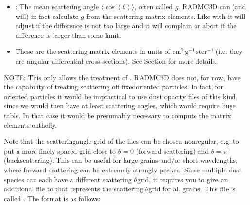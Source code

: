 \documentclass[letterpaper,10pt,english]{sphinxmanual}
\begin{document}
\begin{itemize}
\item {} 
: The mean scattering angle
\(\langle\cos(\theta)\rangle\), often called \(g\). RADMC\sphinxhyphen{}3D can (and will) in
fact calculate \(g\) from the scattering matrix elements. Like with
 it will adjust if the difference is not
too large and it will complain or abort if the difference is larger than
some limit.

\item {} 
 These are the scattering matrix elements
in units of \(\mathrm{cm}^2\, \mathrm{g}^{-1}\,\mathrm{ster}^{-1}\) (i.e. they are angular
differential cross sections). See Section {\hyperref[\detokenize{dustradtrans:sec-scattering}]{}} for
more details.

\end{itemize}

NOTE: This only allows the treatment of . RADMC\sphinxhyphen{}3D
does not, for now, have the capability of treating scattering off fixed\sphinxhyphen{}oriented
particles. In fact, for oriented particles it would be impractical to
use dust opacity files of this kind, since we would then have at least 
scattering angles, which would require huge table. In that case it would be
presumably necessary to compute the matrix elements on\sphinxhyphen{}the\sphinxhyphen{}fly.

Note that the scattering\sphinxhyphen{}angle grid of the  files can
be chosen non\sphinxhyphen{}regular, e.g. to put a more finely spaced grid close to
\(\theta=0\) (forward scattering) and \(\theta=\pi\) (backscattering).
This can be useful for large grains and/or short wavelengths, where forward
scattering can be extremely strongly peaked. Since multiple dust species can
each have a different scattering \(\theta\)\sphinxhyphen{}grid, it requires you to give an
additional file to  that represents the scattering
\(\theta\)\sphinxhyphen{}grid for all grains. This file is called
. The format is as follows:
\end{document}
